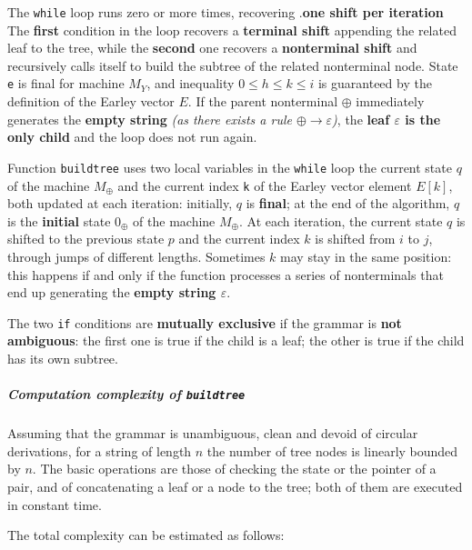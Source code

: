 The \texttt{while} loop runs zero or more times, recovering .\textbf{one shift per iteration}
The \textbf{first} condition in the loop recovers a \textbf{terminal shift} appending the related leaf to the tree, while the \textbf{second} one recovers a \textbf{nonterminal shift} and recursively calls itself to build the subtree of the related nonterminal node.
State \texttt{e} is final for machine \(M_Y\), and inequality \(0 \leq h \leq k \leq i\) is guaranteed by the definition of the Earley vector \(E\).
If the parent nonterminal \(\oplus\) immediately generates the \textbf{empty string} \textit{(as there exists a rule \(\oplus \rightarrow \varepsilon\))}, the \textbf{leaf \(\varepsilon\) is the only child} and the loop does not run again.

Function \texttt{buildtree} uses two local variables in the \texttt{while} loop the current state \(q\) of the machine \(M_\oplus\) and the current index \texttt{k} of the Earley vector element \(E[k]\), both updated at each iteration:
initially, \(q\) is \textbf{final}; at the end of the algorithm, \(q\) is the \textbf{initial} state \(0_\oplus\) of the machine \(M_\oplus\).
At each iteration, the current state \(q\) is shifted to the previous state \(p\) and the current index \(k\) is shifted from \(i\) to \(j\), through jumps of different lengths.
Sometimes \(k\) may stay in the same position: this happens if and only if the function processes a series of nonterminals that end up generating the \textbf{empty string \(\varepsilon\)}.

The two \texttt{if} conditions are \textbf{mutually exclusive} if the grammar is \textbf{not ambiguous}:
the first one is true if the child is a leaf; the other is true if the child has its own subtree.

\subparagraph*{Computation complexity of \texttt{buildtree}}

Assuming that the grammar is unambiguous, clean and devoid of circular derivations, for a string of length \(n\) the number of tree nodes is linearly bounded by \(n\).
The basic operations are those of checking the state or the pointer of a pair, and of concatenating a leaf or a node to the tree; both of them are executed in constant time.

The total complexity can be estimated as follows:

